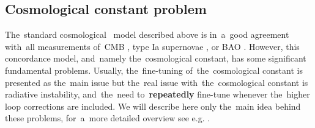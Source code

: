\subsection{Cosmological constant problem}
\label{ssec:lambda}
The~standard cosmological \LCDM\ model described above is in~a~good agreement with~all measurements of~CMB \parencite{planck_cosm}, type Ia supernovae \parencite{Abbott_2019}, or BAO \parencite{BAO_results}. However, this concordance model, and~namely the~cosmological constant, has some significant fundamental problems. Usually, the~fine-tuning of~the~cosmological constant is presented as the~main issue but the~real issue with~the~cosmological constant is radiative instability, and~the~need to~\textbf{repeatedly} fine-tune whenever the~higher loop corrections are included. We will describe here only the~main idea behind these problems, for~a~more detailed overview see e.g. \textcite{2015arXiv150205296P,2012CRPhy..13..566M}.

